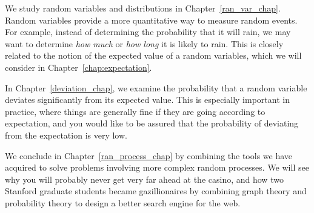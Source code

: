 We study random variables and distributions in
Chapter~\ref{ran_var_chap}.  Random variables provide a more
quantitative way to measure random events.  For example, instead of
determining the probability that it will rain, we may want to
determine \emph{how much} or \emph{how long} it is likely to rain.
This is closely related to the notion of the expected value of a
random variables, which we will consider in
Chapter~\ref{chap:expectation}.

In Chapter~\ref{deviation_chap}, we examine the probability that a
random variable deviates significantly from its expected value.  This
is especially important in practice, where things are generally fine
if they are going according to expectation, and you would like to be
assured that the probability of deviating from the expectation is very
low.

We conclude in Chapter~\ref{ran_process_chap} by combining the tools
we have acquired to solve problems involving more complex random
processes.  We will see why you will probably never get very far ahead
at the casino, and how two Stanford graduate students became
gazillionaires by combining graph theory and probability theory to
design a better search engine for the web.

\endinput
